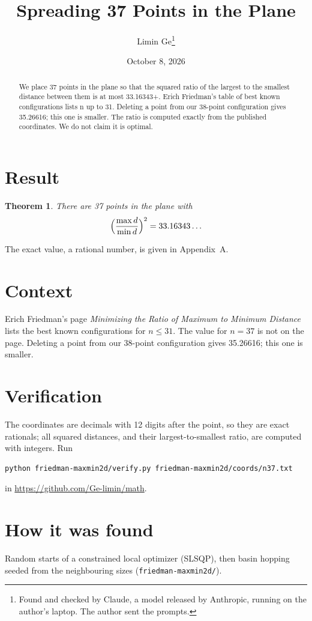 \documentclass[11pt,a4paper]{article}
\title{Spreading 37 Points in the Plane}
\author{Limin Ge\thanks{Found and checked by Claude, a model released by Anthropic, running on the author's laptop. The author sent the prompts.}}
\date{October 8, 2026}
\newtheorem*{theorem}{Theorem}
\begin{document}
\maketitle
\begin{abstract}
We place 37 points in the plane so that the squared ratio of the largest to the smallest distance between them is at most 33.16343+. Erich Friedman's table of best known configurations lists n up to 31. Deleting a point from our 38-point configuration gives 35.26616; this one is smaller. The ratio is computed exactly from the published coordinates. We do not claim it is optimal.
\end{abstract}

\section{Result}
\begin{theorem}
There are 37 points in the plane with
\[ \Bigl(\frac{\max d}{\min d}\Bigr)^2 = 33.16343\ldots \]
\end{theorem}
The exact value, a rational number, is given in Appendix~A.


\section{Context}
Erich Friedman's page \emph{Minimizing the Ratio of Maximum to Minimum Distance} lists the best known configurations for $n\le 31$. The value for $n=37$ is not on the page. Deleting a point from our 38-point configuration gives 35.26616; this one is smaller.


\section{Verification}
The coordinates are decimals with 12 digits after the point, so they are exact rationals; all squared distances, and their largest-to-smallest ratio, are computed with integers. Run
\begin{verbatim}
python friedman-maxmin2d/verify.py friedman-maxmin2d/coords/n37.txt
\end{verbatim}
in \url{https://github.com/Ge-limin/math}.


\section{How it was found}
Random starts of a constrained local optimizer (SLSQP), then basin hopping seeded from the neighbouring sizes (\texttt{friedman-maxmin2d/}).
\end{document}
